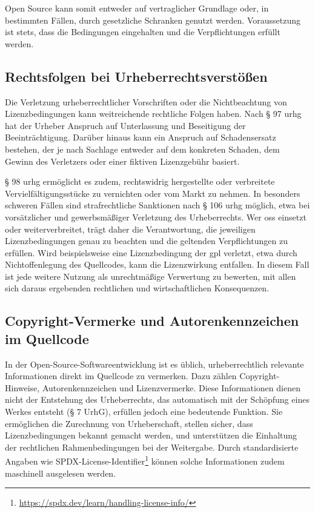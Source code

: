 Open Source kann somit entweder auf vertraglicher Grundlage oder, in bestimmten Fällen, durch gesetzliche Schranken genutzt werden.
Voraussetzung ist stets, dass die Bedingungen eingehalten und die Verpflichtungen erfüllt werden.


\subsection{Rechtsfolgen bei Urheberrechtsverstößen}\label{subsec:rechtsfolgen-bei-urheberrechtsverstoen}

Die Verletzung urheberrechtlicher Vorschriften oder die Nichtbeachtung von Lizenzbedingungen kann weitreichende rechtliche Folgen haben.
Nach § 97 \gls{urhg} hat der Urheber Anspruch auf Unterlassung und Beseitigung der Beeinträchtigung.
Darüber hinaus kann ein Anspruch auf Schadensersatz bestehen, der je nach Sachlage entweder auf dem konkreten Schaden, dem Gewinn des Verletzers oder einer fiktiven Lizenzgebühr basiert.

§ 98 \gls{urhg} ermöglicht es zudem, rechtswidrig hergestellte oder verbreitete Vervielfältigungsstücke zu vernichten oder vom Markt zu nehmen.
In besonders schweren Fällen sind strafrechtliche Sanktionen nach § 106 \gls{urhg} möglich, etwa bei vorsätzlicher und gewerbsmäßiger Verletzung des Urheberrechts.
Wer \gls{oss} einsetzt oder weiterverbreitet, trägt daher die Verantwortung, die jeweiligen Lizenzbedingungen genau zu beachten und die geltenden Verpflichtungen zu erfüllen.
Wird beispielsweise eine Lizenzbedingung der \gls{gpl} verletzt, etwa durch Nichtoffenlegung des Quellcodes, kann die Lizenzwirkung entfallen.
In diesem Fall ist jede weitere Nutzung als unrechtmäßige Verwertung zu bewerten, mit allen sich daraus ergebenden rechtlichen und wirtschaftlichen Konsequenzen.


\subsection{Copyright-Vermerke und Autorenkennzeichen im Quellcode}

In der Open-Source-Softwareentwicklung ist es üblich, urheberrechtlich relevante Informationen direkt im Quellcode zu vermerken.
Dazu zählen Copyright-Hinweise, Autorenkennzeichen und Lizenzvermerke.
Diese Informationen dienen nicht der Entstehung des Urheberrechts, das automatisch mit der Schöpfung eines Werkes entsteht (§ 7 UrhG), erfüllen jedoch eine bedeutende Funktion.
Sie ermöglichen die Zurechnung von Urheberschaft, stellen sicher, dass Lizenzbedingungen bekannt gemacht werden, und unterstützen die Einhaltung der rechtlichen Rahmenbedingungen bei der Weitergabe.
Durch standardisierte Angaben wie SPDX-License-Identifier\footnote{\url{https://spdx.dev/learn/handling-license-info/}} können solche Informationen zudem maschinell ausgelesen werden.

